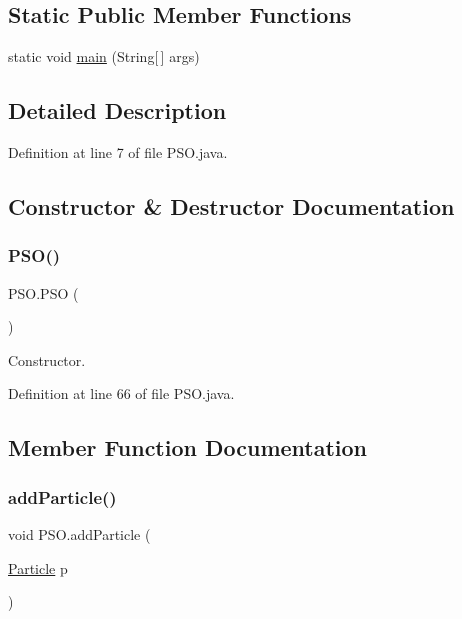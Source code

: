 \subsection*{Static Public Member Functions}
\begin{DoxyCompactItemize}
\item 
static void \hyperlink{class_p_s_o_a966198c3d9ecb21acf593a5e922ba843}{main} (String\mbox{[}$\,$\mbox{]} args)
\end{DoxyCompactItemize}


\subsection{Detailed Description}


Definition at line 7 of file P\+S\+O.\+java.



\subsection{Constructor \& Destructor Documentation}
\mbox{\label{class_p_s_o_a0aeec4970276a5e318b613e8a192064e}} 
\subsubsection{\texorpdfstring{P\+S\+O()}{PSO()}}
{\footnotesize\ttfamily P\+S\+O.\+P\+SO (\begin{DoxyParamCaption}{ }\end{DoxyParamCaption})}

Constructor. 

Definition at line 66 of file P\+S\+O.\+java.



\subsection{Member Function Documentation}
\mbox{\label{class_p_s_o_ac3676d8b4b6eb1fcb0c05a14a20af85c}} 
\subsubsection{\texorpdfstring{add\+Particle()}{addParticle()}}
{\footnotesize\ttfamily void P\+S\+O.\+add\+Particle (\begin{DoxyParamCaption}\item[{\hyperlink{class_particle}{Particle}}]{p }\end{DoxyParamCaption})}


